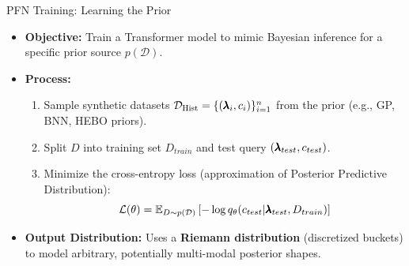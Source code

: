 \documentclass[main]{subfiles}
\begin{document}
\begin{frame}{PFN Training: Learning the Prior}
    \begin{itemize}
        \item \textbf{Objective:} Train a Transformer model to mimic Bayesian inference for a specific prior source $p(\mathcal{D})$.
        \item \textbf{Process:}
            \begin{enumerate}
                \item Sample synthetic datasets $\mathcal{D}_{\text{Hist}} = \{(\pmb{\lambda}_i, c_i)\}_{i=1}^n$ from the prior (e.g., GP, BNN, HEBO priors).
                \item Split $D$ into training set $D_{train}$ and test query $(\pmb{\lambda}_{test}, c_{test})$.
                \item Minimize the cross-entropy loss (approximation of Posterior Predictive Distribution):
                $$ \mathcal{L}(\theta) = \mathbb{E}_{D \sim p(\mathcal{D})} \left[ -\log q_{\theta}(c_{test} | \pmb{\lambda}_{test}, D_{train}) \right] $$ 
            \end{enumerate}
        \item \textbf{Output Distribution:} Uses a \textbf{Riemann distribution} (discretized buckets) to model arbitrary, potentially multi-modal posterior shapes.
    \end{itemize}
\end{frame}
\end{document}
